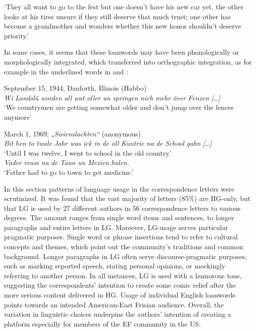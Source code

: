 \documentclass[output=paper]{langsci/langscibook}
\begin{document}
‘They all want to go to the fest but one doesn’t have his new car yet, the other looks at his tires unsure if they still deserve that much trust; one other has become a grandmother and wonders whether this new honor shouldn’t deserve priority.'
\z 

In some cases, it seems that these loanwords may have been phonologically or morphologically integrated, which transferred into orthographic integration, as for example in the underlined words in  and :

  
 \ea
\label{ex:rocker:15}
September 15, 1944; Danforth, Illinois (Habbo)\\
  
\textit{Wi} \textit{Landslü} \textit{worden} \textit{all} \textit{wat} \textit{oller} \textit{un} \textit{springen} \textit{nich} \textit{mehr} \textit{över} \textit{Fenzen} \textit{[…]}\\

‘We countrymen are getting somewhat older and don’t jump over the fences anymore’
\z

  
 \ea
\label{ex:rocker:16}
March 1, 1969; „\textit{Swienslachten“} (anonymous)\\

	\ea \textit{Bit} \textit{hen} \textit{to} \textit{twalv} \textit{Jahr} \textit{was} \textit{ick} \textit{in} \textit{de} \textit{oll} \textit{Kuntrie} \textit{na} \textit{de} \textit{School} \textit{gahn} \textit{[…]}\\
  
	{‘}Until I was twelve, I went to school in the old country.’\\  
 
	\ex \textit{Vader} \textit{muss} \textit{na} \textit{de} \textit{Taun} \textit{un} \textit{Mezien} \textit{halen.}\\
 
  ‘Father had to go to town to get medicine.’
 \z
 \z

 
In this section patterns of language usage in the correspondence letters were scrutinized. It was found that the vast majority of letters (85\%) are HG-only, but that LG is used by 27 different authors in 56 correspondence letters to various degrees. The amount ranges from single word items and sentences, to longer paragraphs and entire letters in LG. Moreover, LG-usage serves particular pragmatic purposes. Single word or phrase insertions tend to refer to cultural concepts and themes, which point out the community’s traditions and common background. Longer paragraphs in LG often serve discourse-pragmatic purposes, such as marking reported speech, stating personal opinions, or mockingly referring to another person. In all instances, LG is used with a humorous tone, suggesting the correspondents’ intention to create some comic relief after the more serious content delivered in HG. Usage of individual English loanwords points towards an intended American-East Frisian audience. Overall, the variation in linguistic choices underpins the authors’ intention of creating a platform especially for members of the EF community in the US. 
 
\end{document}
